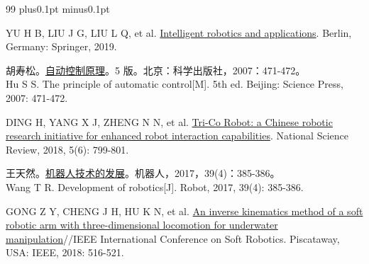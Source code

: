 \documentclass{JQRnew}
\begin{document}
\begin{thebibliography}{99}
\baselineskip=11bp plus0.1pt minus0.1pt%



 YU H B, LIU J G, LIU L Q, et al. \href{https://doi.org/10.1007/978-3-030-27535-8}{Intelligent robotics and applications}\allowbreak[M]. Berlin, Germany: Springer, 2019.

 胡寿松。\href{http://find.nlc.cn/search/showDocDetails?docId=8063907072563311727 & dataSource=ucs01 & query=自动控制原理}{自动控制原理}\allowbreak[M]。5 版。北京：科学出版社，2007：471-472。 \\
Hu S S. The principle of automatic control[M]. 5th ed. Beijing: Science Press, 2007: 471-472.


 DING H, YANG X J, ZHENG N N, et al. \href{https://doi.org/10.1093/nsr/nwx148}{Tri-Co Robot: a Chinese robotic research initiative for enhanced robot interaction capabilities}\allowbreak[J]. National Science Review, 2018, 5(6): 799-801.

 王天然。\href{https://kns.cnki.net/kcms/detail/detail.aspx?dbcode=CJFD & filename=JQRR201704001 & dbname=CJFDLAST2017}{机器人技术的发展}\allowbreak[J]。机器人，2017，39(4)：385-386。 \\
Wang T R. Development of robotics[J]. Robot, 2017, 39(4): 385-386.


 GONG Z Y, CHENG J H, HU K N, et al. \href{http://doi.org/10.1109/ROBOSOFT.2018.8405378}{An inverse kinematics method of a soft robotic arm with three-dimensional locomotion for underwater manipulation}\allowbreak[C]//IEEE International Conference on Soft Robotics. Piscataway, USA: IEEE, 2018: 516-521.


\end{thebibliography}
\end{document}

